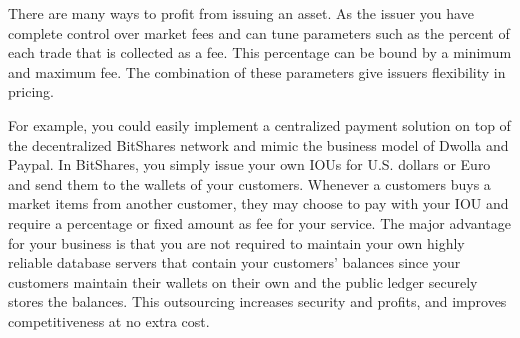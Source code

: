 There are many ways to profit from issuing an asset. As the issuer you have
complete control over market fees and can tune parameters such as the percent
of each trade that is collected as a fee. This percentage can be bound by a
minimum and maximum fee. The combination of these parameters give issuers
flexibility in pricing.

For example, you could easily implement a centralized payment solution on top
of the decentralized BitShares network and mimic the business model of Dwolla
and Paypal. In BitShares, you simply issue your own IOUs for U.S. dollars or
Euro and send them to the wallets of your customers. Whenever a customers buys
a market items from another customer, they may choose to pay with your IOU and
require a percentage or fixed amount as fee for your service. The major
advantage for your business is that you are not required to maintain your own
highly reliable database servers that contain your customers' balances since
your customers maintain their wallets on their own and the public ledger
securely stores the balances. This outsourcing increases security and profits,
and improves competitiveness at no extra cost.
